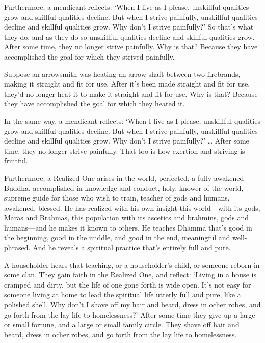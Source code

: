 \documentclass[12pt,openany]{book}%
\begin{document}
Furthermore, a mendicant reflects: ‘When I live as I please, unskillful qualities grow and skillful qualities decline. But when I strive painfully, unskillful qualities decline and skillful qualities grow. Why don’t I strive painfully?’ So that’s what they do, and as they do so unskillful qualities decline and skillful qualities grow. After some time, they no longer strive painfully. Why is that? Because they have accomplished the goal for which they strived painfully. 

Suppose an arrowsmith was heating an arrow shaft between two firebrands, making it straight and fit for use. After it’s been made straight and fit for use, they’d no longer heat it to make it straight and fit for use. Why is that? Because they have accomplished the goal for which they heated it. 

In the same way, a mendicant reflects: ‘When I live as I please, unskillful qualities grow and skillful qualities decline. But when I strive painfully, unskillful qualities decline and skillful qualities grow. Why don’t I strive painfully?’ … After some time, they no longer strive painfully. That too is how exertion and striving is fruitful. 

Furthermore, a Realized One arises in the world, perfected, a fully awakened Buddha, accomplished in knowledge and conduct, holy, knower of the world, supreme guide for those who wish to train, teacher of gods and humans, awakened, blessed. He has realized with his own insight this world—with its gods, \textsanskrit{Māras} and \textsanskrit{Brahmās}, this population with its ascetics and brahmins, gods and humans—and he makes it known to others. He teaches Dhamma that’s good in the beginning, good in the middle, and good in the end, meaningful and well-phrased. And he reveals a spiritual practice that’s entirely full and pure. 

A householder hears that teaching, or a householder’s child, or someone reborn in some clan. They gain faith in the Realized One, and reflect: ‘Living in a house is cramped and dirty, but the life of one gone forth is wide open. It’s not easy for someone living at home to lead the spiritual life utterly full and pure, like a polished shell. Why don’t I shave off my hair and beard, dress in ocher robes, and go forth from the lay life to homelessness?’ After some time they give up a large or small fortune, and a large or small family circle. They shave off hair and beard, dress in ocher robes, and go forth from the lay life to homelessness. 
\end{document}
